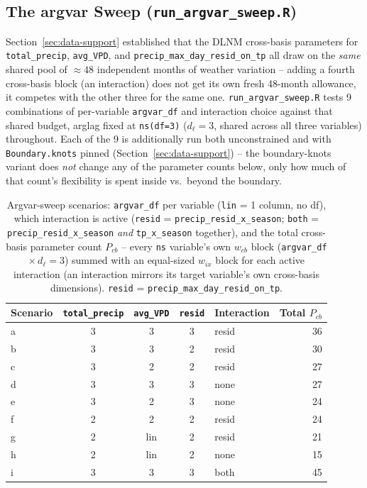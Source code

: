 \documentclass[12pt,a4paper]{article}
\begin{document}
\subsection*{The argvar Sweep (\texttt{run\_argvar\_sweep.R})}

Section~\ref{sec:data-support} established that the DLNM cross-basis parameters for \texttt{total\_precip}, \texttt{avg\_VPD}, and \texttt{precip\_max\_day\_resid\_on\_tp} all draw on the \emph{same} shared pool of $\approx 48$ independent months of weather variation -- adding a fourth cross-basis block (an interaction) does not get its own fresh 48-month allowance, it competes with the other three for the same one. \texttt{run\_argvar\_sweep.R} tests 9 combinations of per-variable \texttt{argvar\_df} and interaction choice against that shared budget, arglag fixed at \texttt{ns(df=3)} ($d_\ell = 3$, shared across all three variables) throughout. Each of the 9 is additionally run both unconstrained and with \texttt{Boundary.knots} pinned (Section~\ref{sec:data-support}) -- the boundary-knots variant does \emph{not} change any of the parameter counts below, only how much of that count's flexibility is spent inside vs.\ beyond the boundary.

\begin{table}[ht]
\centering
\small
\begin{tabular}{lccclr}
\toprule
\textbf{Scenario} & \texttt{total\_precip} & \texttt{avg\_VPD} & \texttt{resid} & \textbf{Interaction} & \textbf{Total $P_{cb}$} \\
\midrule
a & 3 & 3   & 3 & resid & 36 \\
b & 3 & 3   & 2 & resid & 30 \\
c & 3 & 2   & 2 & resid & 27 \\
d & 3 & 3   & 3 & none  & 27 \\
e & 3 & 2   & 3 & none  & 24 \\
f & 2 & 2   & 2 & resid & 24 \\
g & 2 & lin & 2 & resid & 21 \\
h & 2 & lin & 2 & none  & 15 \\
i & 3 & 3   & 3 & both  & 45 \\
\bottomrule
\end{tabular}
\caption{Argvar-sweep scenarios: \texttt{argvar\_df} per variable (\texttt{lin} = 1 column, no df), which interaction is active (\texttt{resid} = \texttt{precip\_resid\_x\_season}; \texttt{both} = \texttt{precip\_resid\_x\_season} \emph{and} \texttt{tp\_x\_season} together), and the total cross-basis parameter count $P_{cb}$ -- every \texttt{ns} variable's own $w_{cb}$ block (\texttt{argvar\_df} $\times\, d_\ell{=}3$) summed with an equal-sized $w_{ix}$ block for each active interaction (an interaction mirrors its target variable's own cross-basis dimensions). \texttt{resid} = \texttt{precip\_max\_day\_resid\_on\_tp}.}
\label{tab:argvar-sweep-scenarios}
\end{table}
\end{document}
